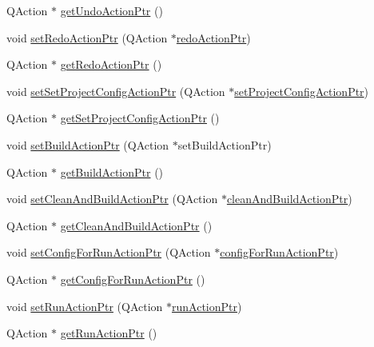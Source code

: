 \begin{DoxyCompactItemize}
\item 
Q\-Action $\ast$ \hyperlink{class_master_actions_aeb84d87b232944fc289dd0425c79e1a7}{get\-Undo\-Action\-Ptr} ()
\item 
void \hyperlink{class_master_actions_aa470d0d50071545456339dd6efd1cd29}{set\-Redo\-Action\-Ptr} (Q\-Action $\ast$\hyperlink{class_master_actions_a7936a9bf0e7418cd864b2fb1ab786d09}{redo\-Action\-Ptr})
\item 
Q\-Action $\ast$ \hyperlink{class_master_actions_ab2015974980e97a75d5d91037be9545b}{get\-Redo\-Action\-Ptr} ()
\item 
void \hyperlink{class_master_actions_a3ec5d73b64fdadc42fe7eb63a3792d53}{set\-Set\-Project\-Config\-Action\-Ptr} (Q\-Action $\ast$\hyperlink{class_master_actions_abe52f232f77f5a5bff35c8e3dadb3d80}{set\-Project\-Config\-Action\-Ptr})
\item 
Q\-Action $\ast$ \hyperlink{class_master_actions_ad81b766a2f083ba53c529cd3f3582cd0}{get\-Set\-Project\-Config\-Action\-Ptr} ()
\item 
void \hyperlink{class_master_actions_a575820c5279053703a99071151ff82c4}{set\-Build\-Action\-Ptr} (Q\-Action $\ast$set\-Build\-Action\-Ptr)
\item 
Q\-Action $\ast$ \hyperlink{class_master_actions_a2c89cb4aa70c13526d98e449a1e3a1b9}{get\-Build\-Action\-Ptr} ()
\item 
void \hyperlink{class_master_actions_a9ed58e080af95465715e9be1c9ee71c6}{set\-Clean\-And\-Build\-Action\-Ptr} (Q\-Action $\ast$\hyperlink{class_master_actions_a2c0f332975bec2424d4af212ab566c5a}{clean\-And\-Build\-Action\-Ptr})
\item 
Q\-Action $\ast$ \hyperlink{class_master_actions_af23ec377bb3603963735d30876e6147e}{get\-Clean\-And\-Build\-Action\-Ptr} ()
\item 
void \hyperlink{class_master_actions_a8b4ef0d552c3dac5c81cf65502650ae5}{set\-Config\-For\-Run\-Action\-Ptr} (Q\-Action $\ast$\hyperlink{class_master_actions_acd6548d1110ae426f384bfeb6acc9c1f}{config\-For\-Run\-Action\-Ptr})
\item 
Q\-Action $\ast$ \hyperlink{class_master_actions_a5266af068fe6ec921cca9e84b9ad7c13}{get\-Config\-For\-Run\-Action\-Ptr} ()
\item 
void \hyperlink{class_master_actions_a28ac730c1a6dd78adf10e1ffcda14aaa}{set\-Run\-Action\-Ptr} (Q\-Action $\ast$\hyperlink{class_master_actions_a3377fe0ddc45ce50119766c8a903c039}{run\-Action\-Ptr})
\item 
Q\-Action $\ast$ \hyperlink{class_master_actions_a99017fd6ad87557fb0dbbf60ced23a23}{get\-Run\-Action\-Ptr} ()

\end{DoxyCompactItemize}
